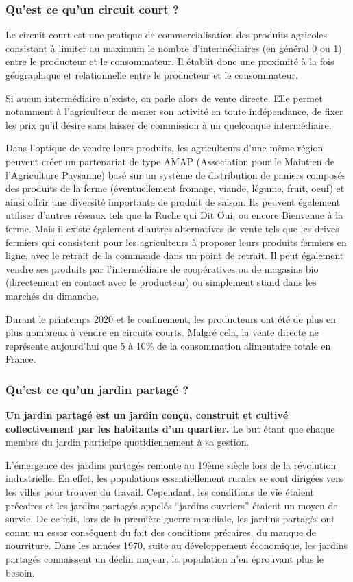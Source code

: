 \documentclass[french,a4paper]{article}
\begin{document}
\subsubsection{Qu’est ce qu’un circuit court ?}

Le circuit court est une pratique de commercialisation des produits agricoles consistant à limiter au maximum le nombre d’intermédiaires (en général 0 ou 1) entre le producteur et le consommateur. Il établit donc une proximité à la fois géographique et relationnelle entre le producteur et le consommateur.

Si aucun intermédiaire n’existe, on parle alors de vente directe. Elle permet notamment à l’agriculteur de mener son activité en toute indépendance, de fixer les prix qu’il désire sans laisser de commission à un quelconque intermédiaire.

Dans l’optique de vendre leurs produits, les agriculteurs d’une même région peuvent créer un partenariat de type AMAP (Association pour le Maintien de l'Agriculture Paysanne) basé sur un système de distribution de paniers  composés des produits de la ferme (éventuellement fromage, viande, légume, fruit, oeuf) et ainsi offrir une diversité importante de produit de saison. Ils peuvent également utiliser d'autres réseaux tels que la Ruche qui Dit Oui, ou encore Bienvenue à la ferme. Mais il existe également d’autres alternatives de vente tels que les drives fermiers qui consistent pour les agriculteurs à proposer leurs produits fermiers en ligne, avec le retrait de la commande dans un point de retrait. Il peut également vendre ses produits par l’intermédiaire de coopératives ou de magasins bio (directement en contact avec le producteur) ou simplement stand dans les marchés du dimanche.

Durant le printemps 2020 et le confinement, les producteurs ont été de plus en plus nombreux à vendre en circuits courts. Malgré cela, la vente directe ne représente aujourd’hui que 5 à 10\% de la consommation alimentaire totale en France.
\subsubsection{Qu’est ce qu’un jardin partagé ?}
\textbf{Un jardin partagé est un jardin conçu, construit et cultivé collectivement par les habitants d’un quartier.} Le but étant que chaque membre du jardin participe quotidiennement à sa gestion.

L’émergence des jardins partagés remonte au 19ème siècle lors de la révolution industrielle. En effet, les populations essentiellement rurales se sont dirigées vers les villes pour trouver du travail. Cependant, les conditions de vie étaient précaires et les jardins partagés appelés  “jardins ouvriers” étaient un moyen de survie. De ce fait, lors de la première guerre mondiale, les jardins partagés ont connu un essor conséquent du fait des conditions précaires, du manque de nourriture.  Dans les années 1970, suite au développement économique, les jardins partagés connaissent un déclin majeur, la population n'en éprouvant plus le besoin.
\end{document}
